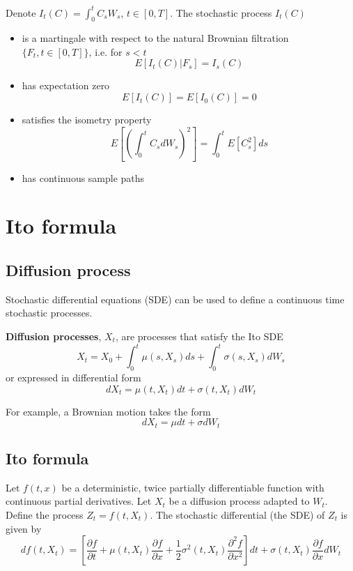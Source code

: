 \documentclass[11pt,a4paper]{book}
\theoremstyle{definition}\newtheorem{definition}{Definition}
\theoremstyle{definition}\newtheorem{fact}{Fact}
\theoremstyle{definition}\newtheorem{remark}{Remark}
\theoremstyle{definition}\newtheorem{ex}{Ex.}
\theoremstyle{definition}\newtheorem{project}{Project}
\theoremstyle{definition}\newtheorem{problem}{Problem}
\theoremstyle{definition}\newtheorem{example}{Example}
\numberwithin{theorem}{section}
\numberwithin{corollary}{chapter}
\numberwithin{assumption}{chapter}
\numberwithin{definition}{chapter}
\numberwithin{prop}{chapter}
\numberwithin{notation}{chapter}
\numberwithin{problem}{chapter}
\numberwithin{example}{chapter}
\numberwithin{fact}{chapter}
\numberwithin{ex}{chapter}
\begin{document}
Denote $I_t(C) = \int_0^t C_s W_s$, $t \in [0, T]$. The stochastic process $I_t(C)$
\begin{itemize}
\item is a martingale with respect to the natural Brownian filtration $\{F_t, t \in [0, T]\}$, i.e. for $s<t$
$$ E[I_t(C) | F_s] = I_s(C) $$
\item has expectation zero
$$ E[I_t(C)] = E[I_0(C)] = 0 $$
\item satisfies the isometry property
$$ E[(\int_0^t C_s dW_s)^2] = \int_0^t E[C_s^2] ds $$
\item has continuous sample paths
\end{itemize}

\section{Ito formula}

\subsection{Diffusion process}
Stochastic differential equations (SDE) can be used to define a continuous time stochastic processes.

\textbf{Diffusion processes}, $X_t$, are processes that satisfy the Ito SDE
\begin{equation}
X_t = X_0 + \int_0^t \mu(s,X_s) ds + \int_0^t \sigma(s,X_s) dW_s
\end{equation}
or expressed in differential form
\begin{equation}
dX_t = \mu(t,X_t) dt + \sigma(t,X_t) dW_t
\end{equation}

For example, a Brownian motion takes the form
$$ dX_t = \mu dt + \sigma dW_t $$

\subsection{Ito formula}
Let $f(t, x)$ be a deterministic, twice partially differentiable function with continuous partial derivatives. Let $X_t$ be a diffusion process adapted to $W_t$. Define the process $Z_t = f(t, X_t)$. The stochastic differential (the SDE) of $Z_t$ is given by
\begin{equation}
df(t,X_t) = \left[ \frac{\partial f}{\partial t} + \mu(t,X_t) \frac{\partial f}{\partial x} + \frac{1}{2} \sigma^2(t,X_t) \frac{\partial^2 f}{\partial x^2} \right] dt + \sigma(t,X_t) \frac{\partial f}{\partial x} dW_t
\end{equation}
\end{document}
